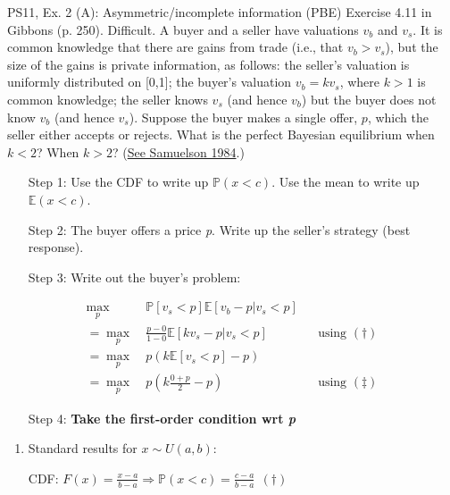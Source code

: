 \begin{frame}{PS11, Ex. 2 (A): Asymmetric/incomplete information (PBE)}
    Exercise 4.11 in Gibbons (p. 250). Difficult. A buyer and a seller have valuations $v_b$ and $v_s$. It is common knowledge that there are gains from trade (i.e., that $v_b > v_s$), but the size of the gains is private information, as follows: the seller’s valuation is uniformly distributed on [0,1]; the buyer’s valuation $v_b = kv_s$, where $k > 1$ is common knowledge; the seller knows $v_s$ (and hence $v_b$) but the buyer does not know $v_b$ (and hence $v_s$). Suppose the buyer makes a single offer, $p$, which the seller either accepts or rejects. What is the perfect Bayesian equilibrium when $k < 2$? When $k > 2$? (\href{https://www.jstor.org/stable/1911195}{See Samuelson 1984}.) \vspace{-8pt}
    \begin{multicols}{2}
      \begin{itemize}
        \item[Step 1:] Use the CDF to write up $\mathbb{P}(x<c)$. Use the mean to write up $\mathbb{E}(x<c)$.
        \item[Step 2:] The buyer offers a price \textit{p}. Write up the seller's strategy (best response).
        \item[Step 3:] Write out the buyer's problem:
      \end{itemize} \vspace{-8pt}
      \begin{align*}
         \displaystyle{\max_p}&\ \mathbb{P}[v_s<p]\mathbb{E}[v_b-p|v_s<p]\\
        =\displaystyle{\max_p}&\ \frac{p-0}{1-0}\mathbb{E}[kv_s-p|v_s<p]&&\text{using }(\dagger)\\
        =\displaystyle{\max_p}&\ p\left(k\mathbb{E}[v_s<p]-p\right)\\
        =\displaystyle{\max_p}&\ p\left(k\frac{0+p}{2}-p\right)&&\text{using }(\ddagger)
      \end{align*} \vspace{-8pt}
      \begin{itemize}
        \item[Step 4:] \textbf{Take the first-order condition wrt \textit{p}}
      \end{itemize}
      \vfill\null\columnbreak
      \begin{enumerate}
        \item Standard results for $x\sim U(a, b):$
        \item[CDF:] $F(x)=\frac{x-a}{b-a}\Rightarrow\mathbb{P}(x<c)=\frac{c-a}{b-a}\ \ (\dagger)$

\end{enumerate}
\end{multicols}
\end{frame}
